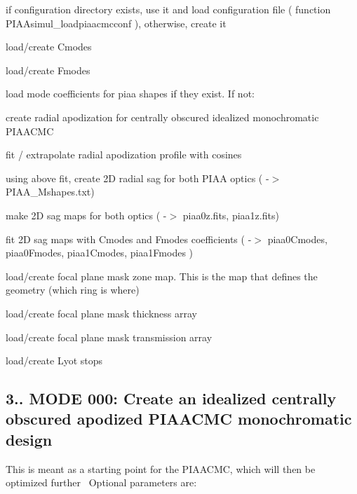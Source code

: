 \begin{DoxyEnumerate}
\item if configuration directory exists, use it and load configuration file ( function P\+I\+A\+Asimul\+\_\+loadpiaacmcconf ), otherwise, create it
\item load/create Cmodes
\item load/create Fmodes
\item load mode coefficients for piaa shapes if they exist. If not\+:
\begin{DoxyEnumerate}
\item create radial apodization for centrally obscured idealized monochromatic P\+I\+A\+A\+C\+M\+C
\item fit / extrapolate radial apodization profile with cosines
\item using above fit, create 2\+D radial sag for both P\+I\+A\+A optics ( -\/$>$ P\+I\+A\+A\+\_\+\+Mshapes.\+txt)
\item make 2\+D sag maps for both optics ( -\/$>$ piaa0z.\+fits, piaa1z.\+fits)
\item fit 2\+D sag maps with Cmodes and Fmodes coefficients ( -\/$>$ piaa0\+Cmodes, piaa0\+Fmodes, piaa1\+Cmodes, piaa1\+Fmodes )
\end{DoxyEnumerate}
\item load/create focal plane mask zone map. This is the map that defines the geometry (which ring is where)
\item load/create focal plane mask thickness array
\item load/create focal plane mask transmission array
\item load/create Lyot stops
\end{DoxyEnumerate}\hypertarget{md_src_PIAACMCsimul_README_mode000}{}\subsection{3.. M\+O\+D\+E 000\+: Create an idealized centrally obscured apodized P\+I\+A\+A\+C\+M\+C monochromatic design}\label{md_src_PIAACMCsimul_README_mode000}
This is meant as a starting point for the P\+I\+A\+A\+C\+M\+C, which will then be optimized further~\newline
Optional parameters are\+:
